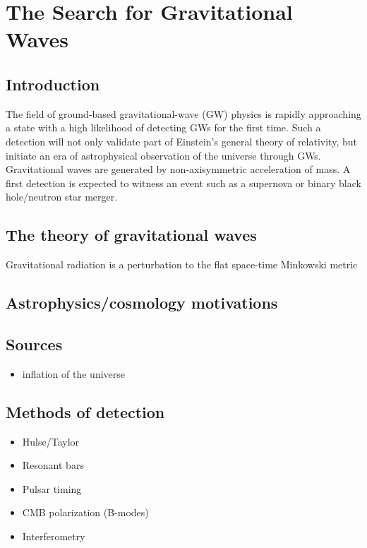 \chapter{The Search for Gravitational Waves}

\section{Introduction}
The field of ground-based gravitational-wave (GW) physics is rapidly
approaching a state with a high likelihood of detecting GWs for the
first time. Such a detection will not only validate part of Einstein's
general theory of relativity, but initiate an era of astrophysical
observation of the universe through GWs. Gravitational waves are
generated by non-axisymmetric acceleration of mass. A first
detection is expected to witness an event such as a supernova or
binary black hole/neutron star merger. 

\section{The theory of gravitational waves}
Gravitational radiation is a perturbation to the flat space-time
Minkowski metric 

\section{Astrophysics/cosmology motivations}

\section{Sources}
\begin{itemize}
\item inflation of the universe
\end{itemize}

\section{Methods of detection}
\begin{itemize}
\item Hulse/Taylor
\item Resonant bars
\item Pulsar timing
\item CMB polarization (B-modes)
\item Interferometry
\end{itemize}

